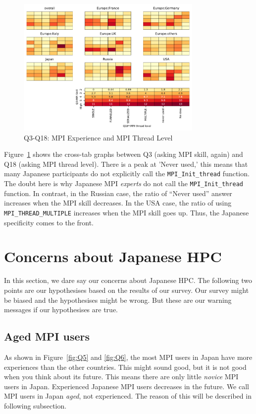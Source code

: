 \documentclass[submit,techrep,noauthor,english]{ipsj}
\begin{document}
\begin{figure}[htb]
\begin{center}
\includegraphics[width=9cm]{../pdfs/Q3-Q18.pdf}
\caption{Q3-Q18: MPI Experience and MPI Thread Level}
\label{fig:q3-q18}
\end{center}
\end{figure}

Figure~\ref{fig:q3-q18} shows the cross-tab graphs between
Q3 (asking MPI skill, again) and Q18 (asking MPI thread
level). There is a peak at 'Never used,' this means that many Japanese
participants do not explicitly call the {\tt MPI\_Init\_thread}
function.  The doubt here is why Japanese MPI {\em experts} do not
call the {\tt MPI\_Init\_thread} function. 
In contrast, in the Russian case, the ratio of ``Never used'' answer
increases when the  MPI skill decreases. In the USA case, the ratio of
using {\tt MPI\_THREAD\_MULTIPLE} increases when the MPI skill goes
up. Thus, the Japanese specificity comes to the front.

\section{Concerns about Japanese HPC}

In this section, we dare say our concerns about Japanese HPC. The
following two points are our hypothesises based on the results of our 
survey. Our survey might be biased and the hypothesises might be
wrong. But these are our warning messages if our hypothesises are
true. 

\subsection{Aged MPI users}

As shown in Figure~\ref{fig:Q5} and \ref{fig:Q6}, the most MPI users
in Japan have more experiences than the other countries. This might
sound good, but it is not good when you think about its future.  This
means there are only little {\em novice} MPI users in Japan.
Experienced Japanese MPI users decreases in the future.  We
call MPI users in Japan {\em aged}, not experienced. The reason of
this will be described in following subsection.
\end{document}
